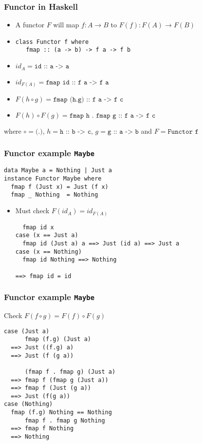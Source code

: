 \documentclass{beamer} %
\begin{document}
\begin{frame}[fragile]\frametitle{Functor in Haskell}
  \begin{itemize}
    \item A functor $F$ will map $f : A \rightarrow B$ to $F(f) : F(A) \rightarrow F(B)$

    \item
\begin{verbatim}
class Functor f where
   fmap :: (a -> b) -> f a -> f b
\end{verbatim}

  \item $id_A = \texttt{id :: a -> a}$

  \item $id_{F(A)} = \texttt{fmap id :: f a -> f a}$

  \item $F(h\circ g) = \texttt{fmap (h.g) :: f a -> f c}$

  \item $F(h) \circ F(g) = \texttt{fmap h . fmap g :: f a -> f c}$
  \end{itemize}
  where $\circ = \texttt{(.)}$, $h = \texttt{h :: b -> c}$,  $g = \texttt{g :: a -> b}$ and
  $F = \texttt{Functor f}$
\end{frame}

\begin{frame}[fragile]\frametitle{Functor example \texttt{Maybe}}
\begin{verbatim}
data Maybe a = Nothing | Just a
instance Functor Maybe where
  fmap f (Just x) = Just (f x)
  fmap _ Nothing  = Nothing
\end{verbatim}
\begin{itemize}
  \item Must check $F(id_A) = id_{F(A)}$
\begin{verbatim}
  fmap id x
case (x == Just a)
  fmap id (Just a) a ==> Just (id a) ==> Just a
case (x == Nothing)
  fmap id Nothing ==> Nothing

==> fmap id = id
\end{verbatim}
\end{itemize}
\end{frame}

\begin{frame}[fragile]\frametitle{Functor example \texttt{Maybe}}
Check $F(f \circ g) = F(f) \circ F(g)$
\begin{verbatim}
case (Just a)
      fmap (f.g) (Just a)
  ==> Just ((f.g) a)
  ==> Just (f (g a))

      (fmap f . fmap g) (Just a)
  ==> fmap f (fmap g (Just a))
  ==> fmap f (Just (g a))
  ==> Just (f(g a))
case (Nothing)
  fmap (f.g) Nothing == Nothing
      fmap f . fmap g Nothing
  ==> fmap f Nothing
  ==> Nothing
\end{verbatim}
\end{frame}
\end{document}
